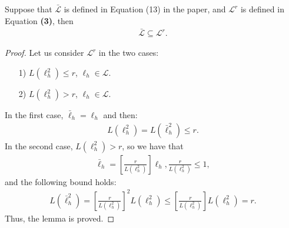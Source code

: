 \documentclass[10pt]{llncs}
\begin{document}
\begin{lemma}
\label{lem-lrs-subset-lr}
  Suppose that $\bar{\mathcal{L}}$ is defined in Equation \textrm{(13)} in the paper,
  and $\mathcal{L}^r$ is defined in Equation \textbf{(3)},
  then
  \begin{align*}
    \bar{\mathcal{L}}\subseteq \mathcal{L}^r.
  \end{align*}
\end{lemma}
\begin{proof}
  Let us consider $\mathcal{L}^r$ in the two cases:
  \begin{itemize}
    \item[1)] $L(\ell_h^2)\leq r$, $\ell_h\in\mathcal{L}$.
    \item[2)] $L(\ell_h^2)>r$, $\ell_h\in\mathcal{L}$.
  \end{itemize}
  In the first case, $\bar{\ell}_h=\ell_h$ and then:
  \begin{align*}
    L(\ell_h^2)=L(\bar{\ell}_h^2)\leq r.
  \end{align*}
  In the second case, $L(\ell_h^2)>r$, so we have that
  \begin{align*}
    \bar{\ell}_h=
    \left[\frac{r}{L(\ell_h^2)}\right]\ell_h, \frac{r}{L(\ell_h^2)}\leq 1,
  \end{align*}
  and the following bound holds:
  \begin{align*}
    L(\bar{\ell}_h^2)= \left[\frac{r}{L(\ell_h^2)}
    \right]^2L(\ell_h^2)\leq \left[\frac{r}{L(\ell_h^2)}
    \right]L(\ell_h^2)= r.
  \end{align*}
  Thus, the lemma is proved.
\end{proof}
\end{document}
